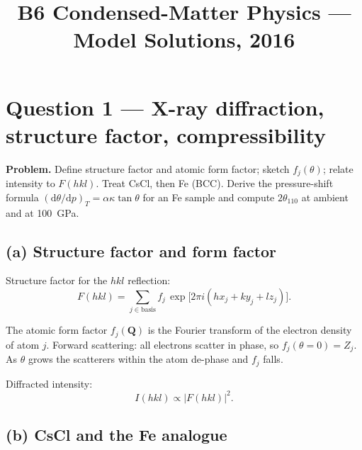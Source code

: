 \documentclass[11pt]{article}
\title{B6 Condensed-Matter Physics --- Model Solutions, 2016}
\author{}
\date{}
\newcommand{\de}{\mathrm{d}}
\begin{document}
\maketitle

\section*{Question 1 --- X-ray diffraction, structure factor, compressibility}

\textbf{Problem.} Define structure factor and atomic form factor; sketch $f_j(\theta)$; relate intensity to $F(hkl)$. Treat CsCl, then Fe (BCC). Derive the pressure-shift formula $(\de\theta/\de p)_T = \alpha\kappa\tan\theta$ for an Fe sample and compute $2\theta_{110}$ at ambient and at \SI{100}{GPa}.

\subsection*{(a) Structure factor and form factor}

Structure factor for the $hkl$ reflection:
\begin{equation}
F(hkl) = \sum_{j\in\text{basis}} f_j\,\exp\!\bigl[2\pi i(hx_j + ky_j + lz_j)\bigr].
\label{eq:F}
\end{equation}

The atomic form factor $f_j(\bm Q)$ is the Fourier transform of the electron density of atom $j$. Forward scattering: all electrons scatter in phase, so $f_j(\theta=0) = Z_j$. As $\theta$ grows the scatterers within the atom de-phase and $f_j$ falls.

\begin{center}
\end{center}

Diffracted intensity:
\[
I(hkl) \propto |F(hkl)|^2.
\]

\subsection*{(b) CsCl and the Fe analogue}
\end{document}
